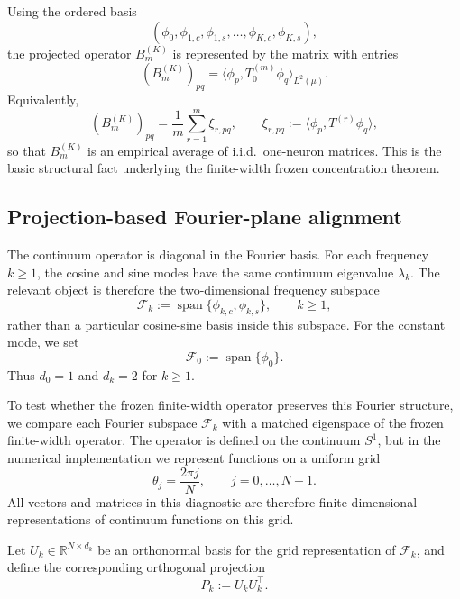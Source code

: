 Using the ordered basis
\[
	(\phi_0,\phi_{1,c},\phi_{1,s},\dots,\phi_{K,c},\phi_{K,s}),
\]
the projected operator \(B_m^{(K)}\) is represented by the matrix with entries
\begin{equation}
	(B_m^{(K)})_{pq}
	=
	\langle \phi_p,T_0^{(m)}\phi_q\rangle_{L^2(\mu)}.
	\label{eq:method-finite-width-block-entry}
\end{equation}
Equivalently,
\begin{equation}
	(B_m^{(K)})_{pq}
	=
	\frac1m\sum_{r=1}^m \xi_{r,pq},
	\qquad
	\xi_{r,pq}:=\langle \phi_p,T^{(r)}\phi_q\rangle,
	\label{eq:method-finite-width-entry-average}
\end{equation}
so that \(B_m^{(K)}\) is an empirical average of i.i.d.\ one-neuron matrices. This is the
basic structural fact underlying the finite-width frozen concentration theorem.

\subsection{Projection-based Fourier-plane alignment}
\label{subsec:method-projector-error}

The continuum operator is diagonal in the Fourier basis. For each frequency
\(k\ge 1\), the cosine and sine modes have the same continuum eigenvalue
\(\lambda_k\). The relevant object is therefore the two-dimensional frequency
subspace
\[
	\mathcal F_k
	:=
	\operatorname{span}\{\phi_{k,c},\phi_{k,s}\},
	\qquad k\ge 1,
\]
rather than a particular cosine-sine basis inside this subspace. For the
constant mode, we set
\[
	\mathcal F_0:=\operatorname{span}\{\phi_0\}.
\]
Thus \(d_0=1\) and \(d_k=2\) for \(k\ge 1\).

To test whether the frozen finite-width operator preserves this Fourier
structure, we compare each Fourier subspace \(\mathcal F_k\) with a matched
eigenspace of the frozen finite-width operator. The operator is defined on the
continuum \(S^1\), but in the numerical implementation we represent functions
on a uniform grid
\[
	\theta_j=\frac{2\pi j}{N},
	\qquad j=0,\dots,N-1.
\]
All vectors and matrices in this diagnostic are therefore finite-dimensional
representations of continuum functions on this grid.

Let \(U_k\in\mathbb R^{N\times d_k}\) be an orthonormal basis for the grid
representation of \(\mathcal F_k\), and define the corresponding orthogonal
projection
\begin{equation}
	P_k := U_kU_k^\top .
	\label{eq:method-fourier-projector}
\end{equation}

